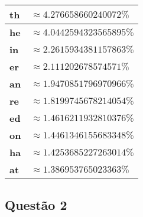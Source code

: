 \documentclass{article}
\begin{document}
\begin{enumerate}
    \begin{center}
        \begin{tabular}{>{\bfseries}ll}
            \hline
            th & $\approx 4.276658660240072\%$     \\ \hline
            he & $\approx 4.0442594323565895\%$    \\ \hline
            in & $\approx 2.2615934381157863\%$    \\ \hline
            er & $\approx 2.111202678574571\%$     \\ \hline
            an & $\approx 1.9470851796970966\%$    \\ \hline
            re & $\approx 1.8199745678214054\%$    \\ \hline
            ed & $\approx 1.4616211932810376\%$    \\ \hline
            on & $\approx 1.4461346155683348\%$    \\ \hline
            ha & $\approx 1.4253685227263014\%$    \\ \hline
            at & $\approx 1.386953765023363\%$     \\ \hline
        \end{tabular}
    \end{center}

\end{enumerate}

\subsection*{Questão 2}
\end{document}
